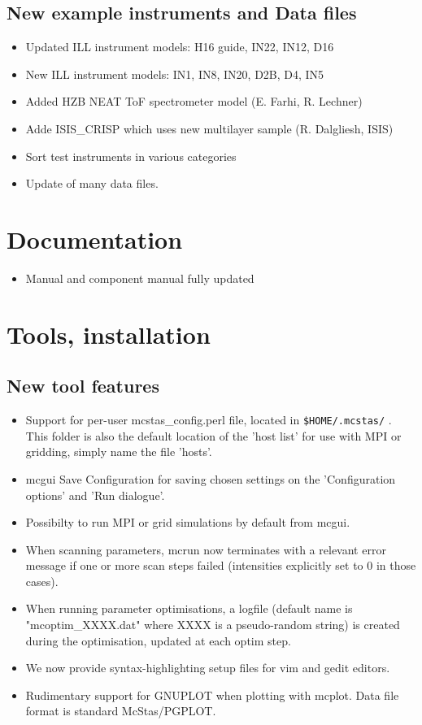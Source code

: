 \subsection{New example instruments and Data files}
\begin{itemize}
\item Updated ILL instrument models: H16 guide, IN22, IN12, D16
\item New ILL instrument models: IN1, IN8, IN20, D2B, D4, IN5
\item Added HZB NEAT ToF spectrometer model (E. Farhi, R. Lechner)
\item Adde ISIS\_CRISP which uses new multilayer sample (R. Dalgliesh, ISIS)
\item Sort test instruments in various categories
\item Update of many data files.
\end{itemize}

\section{Documentation}
\label{s:new-features:documentation}
\begin{itemize}
\item Manual and component manual fully updated 
\end{itemize}

\section{Tools, installation}
\label{s:new-features:tools}
\subsection{New tool features}
\begin{itemize}
  \item Support for per-user mcstas\_config.perl file, located in \verb+$HOME/.mcstas/+ . This folder is also the default
     location of the 'host list' for use with MPI or gridding, simply name the file 'hosts'.
  \item mcgui Save Configuration for saving chosen settings on the 'Configuration options' and 'Run dialogue'.
  \item Possibilty to run MPI or grid simulations by default from mcgui.
  \item When scanning parameters, mcrun now terminates with a relevant error message if one or more scan steps
     failed (intensities explicitly set to 0 in those cases).
  \item When running parameter optimisations, a logfile (default name is "mcoptim\_XXXX.dat" where XXXX is a
     pseudo-random string) is created during the optimisation, updated at each optim step.
  \item We now provide syntax-highlighting setup files for vim and gedit editors.
  \item Rudimentary support for GNUPLOT when plotting with mcplot. Data file format is standard McStas/PGPLOT.
\end{itemize}
